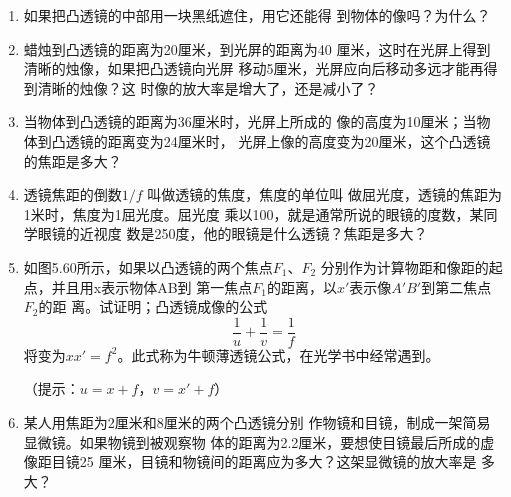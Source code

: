 \begin{enumerate}
\begin{figure}[htp]
	\caption{}
\end{figure}
\item 如果把凸透镜的中部用一块黑纸遮住，用它还能得
到物体的像吗？为什么？
\item 蜡烛到凸透镜的距离为20厘米，到光屏的距离为40
厘米，这时在光屏上得到清晰的烛像，如果把凸透镜向光屏
移动5厘米，光屏应向后移动多远才能再得到清晰的烛像？这
时像的放大率是增大了，还是减小了？
\item 当物体到凸透镜的距离为36厘米时，光屏上所成的
像的高度为10厘米；当物体到凸透镜的距离变为24厘米时，
光屏上像的高度变为20厘米，这个凸透镜的焦距是多大？
\item 透镜焦距的倒数$1/f$
叫做透镜的焦度，焦度的单位叫
做屈光度，透镜的焦距为1米时，焦度为1屈光度。屈光度
乘以100，就是通常所说的眼镜的度数，某同学眼镜的近视度
数是250度，他的眼镜是什么透镜？焦距是多大？
\item 如图5.60所示，如果以凸透镜的两个焦点$F_1$、$F_2$
分别作为计算物距和像距的起点，并且用x表示物体AB到
第一焦点$F_1$的距离，以$x'$表示像$A'B'$到第二焦点$F_2$的距
离。试证明；凸透镜成像的公式
\[\frac{1}{u}+\frac{1}{v}=\frac{1}{f} \]
将变为$xx'=f^2$。此式称为牛顿薄透镜公式，在光学书中经常遇到。
\begin{figure}[htp]
	\centering
{}
	\caption{}
\end{figure}
（提示：$u=x+f$，$v=x'+f$）
\item 某人用焦距为2厘米和8厘米的两个凸透镜分别
作物镜和目镜，制成一架简易显微镜。如果物镜到被观察物
体的距离为2.2厘米，要想使目镜最后所成的虚像距目镜25
厘米，目镜和物镜间的距离应为多大？这架显微镜的放大率是
多大？
\end{enumerate}


